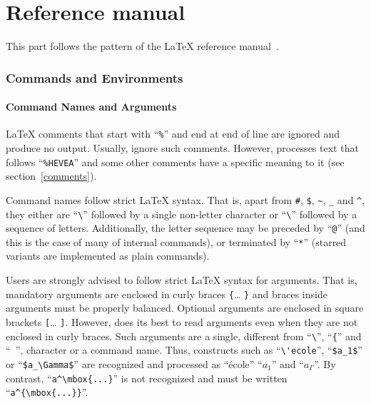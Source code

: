 \setcounter{section}{0}
\renewcommand{\thesection}{\thepart.\arabic{section}}
\cutend

\part{Reference manual}
\label{referencemanual}
This part follows the pattern of the \LaTeX{} reference
manual~\cite[Appendix~C]{latex}.

\section{Commands and Environments}

\subsection{Command Names and Arguments}

\LaTeX{} comments that start with ``\verb+%+'' %
and end at end of line are ignored and produce no output.
Usually, \hevea{} ignore such comments. However, \hevea{} processes
text that follows ``\verb+%HEVEA+'' %
and some other comments have a specific meaning to it (see
section~\ref{comments}).

Command names follow strict \LaTeX{} syntax. That is, apart from
\verb+#+, \verb+$+, %
\verb+~+, \verb+_+ and \verb+^+, they either are
``\verb+\+'' followed by a single non-letter character or
``\verb+\+'' followed by a sequence of letters.
Additionally, the letter sequence may be preceded by ``\verb+@+''
(and this is the case of many of \hevea{} internal commands), or
terminated by ``\verb+*+'' (starred variants are implemented as plain
commands).

Users are strongly advised to follow strict \LaTeX{} syntax for
arguments. That is, mandatory arguments are enclosed in curly braces
\verb+{+\ldots{} \verb+}+ and braces inside arguments must be properly
balanced.
Optional arguments are enclosed in square brackets \verb+[+\ldots{}
\verb+]+.
However, \hevea{} does its best to read arguments even when they are
not enclosed in curly braces.
Such arguments are a single, different from ``\verb+\+'', ``\verb+{+''
and ``\verb+ +'', character or
a command name.
Thus, constructs such as ``\verb+\'ecole+'',
``\verb+$a_1$+'' or ``\verb+$a_\Gamma$+'' are
recognized and processed as ``\'ecole'' ``$a_1$'' and ``$a_\Gamma$''.
By contrast, ``\verb+a^\mbox{...}+'' is not recognized
and must be written  ``\verb+a^{\mbox{...}}+''.


